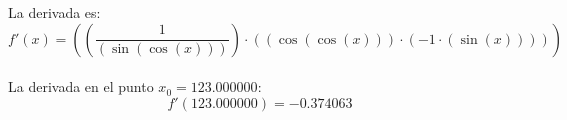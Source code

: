 \documentclass{article}
\begin{document}
La derivada es:
\[
f'(x)=\left(\left(\frac{1}{\left(\sin\left(\cos(x)\right)\right)}\right)\cdot \left(\left(\cos\left(\cos(x)\right)\right)\cdot \left(-1\cdot \left(\sin(x)\right)\right)\right)\right)
\]\\La derivada en el punto $x_0=123.000000$:
\[
f'(123.000000)=-0.374063
\]
\end{document}

